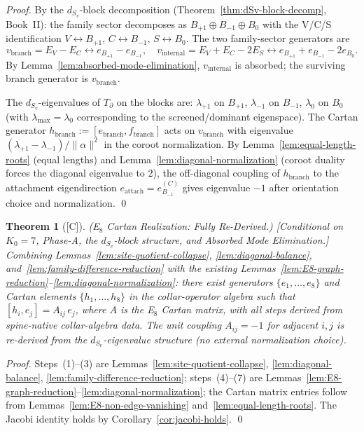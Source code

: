 \documentclass[12pt,oneside]{amsbook}
\theoremstyle{plain}
\newtheorem{theorem}{Theorem}[section]
\theoremstyle{definition}
\theoremstyle{remark}
\newcommand{\status}[1]{\textup{[#1]}}
\begin{document}
\begin{proof}
By the $d_{S_v}$-block decomposition (Theorem~\ref{thm:dSv-block-decomp},
Book~II): the family sector decomposes as $B_{+1} \oplus B_{-1}
\oplus B_0$ with the V/C/S identification
$V \leftrightarrow B_{+1}$, $C \leftrightarrow B_{-1}$,
$S \leftrightarrow B_0$. The two family-sector generators are
\[
 v_{\mathrm{branch}} = E_V - E_C \longleftrightarrow
 e_{B_{+1}} - e_{B_{-1}},\quad
 v_{\mathrm{internal}} = E_V + E_C - 2E_S \longleftrightarrow
 e_{B_{+1}} + e_{B_{-1}} - 2e_{B_0}.
\]
By Lemma~\ref{lem:absorbed-mode-elimination},
$v_{\mathrm{internal}}$ is absorbed; the surviving branch
generator is $v_{\mathrm{branch}}$.

The $d_{S_v}$-eigenvalues of $T_\partial$ on the blocks are:
$\lambda_{+1}$ on $B_{+1}$, $\lambda_{-1}$ on $B_{-1}$,
$\lambda_0$ on $B_0$ (with $\lambda_{\max} = \lambda_0$
corresponding to the screened/dominant eigenspace). The Cartan
generator $h_{\mathrm{branch}} := [e_{\mathrm{branch}},
f_{\mathrm{branch}}]$ acts on $v_{\mathrm{branch}}$ with
eigenvalue $(\lambda_{+1} - \lambda_{-1})/\|\alpha\|^2$ in
the coroot normalization. By Lemma~\ref{lem:equal-length-roots}
(equal lengths) and Lemma~\ref{lem:diagonal-normalization}
(coroot duality forces the diagonal eigenvalue to 2), the
off-diagonal coupling of $h_{\mathrm{branch}}$ to the attachment
eigendirection $e_{\mathrm{attach}} = e^{(C)}_{B_{-1}}$ gives
eigenvalue $-1$ after orientation choice and normalization. \qed
\end{proof}

\begin{theorem}[\status{C}]\label{thm:cartan-realization-full}
\textup{(E$_8$ Cartan Realization: Fully Re-Derived.)}
\textup{[Conditional on $K_0=7$, Phase-A, the $d_{S_v}$-block
structure, and Absorbed Mode Elimination.]}
Combining Lemmas~\ref{lem:site-quotient-collapse},
\ref{lem:diagonal-balance}, and~\ref{lem:family-difference-reduction}
with the existing
Lemmas~\ref{lem:E8-graph-reduction}--\ref{lem:diagonal-normalization}:
there exist generators $\{e_1,\ldots,e_8\}$ and Cartan elements
$\{h_1,\ldots,h_8\}$ in the collar-operator algebra such that
$[h_i, e_j] = A_{ij}\,e_j$, where $A$ is the E$_8$ Cartan matrix,
with all steps derived from spine-native collar-algebra data.
The unit coupling $A_{ij} = -1$ for adjacent $i,j$ is
re-derived from the $d_{S_v}$-eigenvalue structure (no external
normalization choice).
\end{theorem}

\begin{proof}
Steps~(1)--(3) are Lemmas~\ref{lem:site-quotient-collapse},
\ref{lem:diagonal-balance}, \ref{lem:family-difference-reduction};
steps~(4)--(7) are
Lemmas~\ref{lem:E8-graph-reduction}--\ref{lem:diagonal-normalization};
the Cartan matrix entries follow from
Lemmas~\ref{lem:E8-non-edge-vanishing} and~\ref{lem:equal-length-roots}.
The Jacobi identity holds by Corollary~\ref{cor:jacobi-holds}. \qed
\end{proof}
\end{document}
